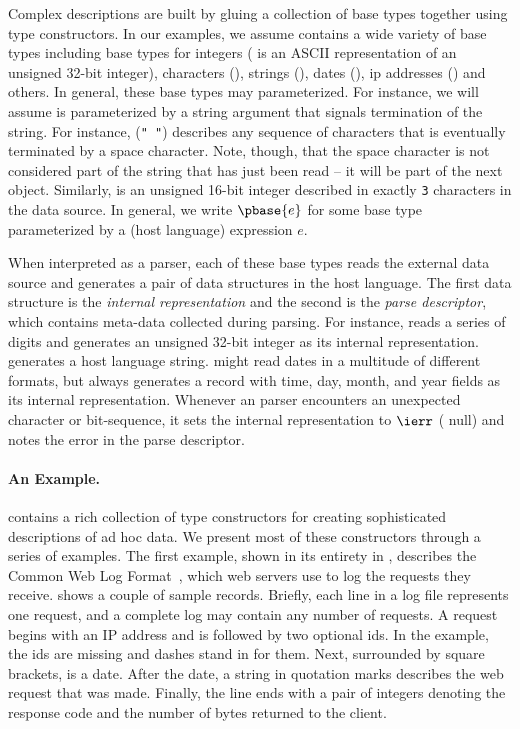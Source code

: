 Complex \ipads{} descriptions are built by gluing a collection of base
types together using \ipads{} type constructors.  In our examples, we
assume \ipads{} contains a wide variety of base types including base
types for integers (\Puint{} is an ASCII representation of an unsigned
32-bit integer), characters (\Pchar), strings (\Pstring), dates
(\Pdate), ip addresses (\Pip) and others.  In general, these base
types may parameterized.  For instance, we will assume \Pstring{} is
parameterized by a string argument that signals termination of the
string.  For instance, \Pstring({\tt " "}) describes any sequence of
characters that is eventually terminated by a space character. Note,
though, that the space character is not considered part of the string
that has just been read -- it will be part of the next object.
Similarly,  is an unsigned 16-bit
integer described in exactly {\tt 3} characters in the data source.
In general, we write $\pbase{e}$ for some base type parameterized by a
(host language) expression $e$.

When interpreted as a parser, each of these base types reads
the external data source and generates a pair of data structures
in the host language.  The first data structure is the
{\em internal representation}  and
the second is the {\em parse descriptor}, which contains meta-data collected during parsing.
For instance, \Puint{} reads a series of digits and generates an unsigned 32-bit integer as its
internal representation.  \Pstring{} generates a 
host language string.  
\Pdate{} might read dates in a multitude of
different formats, but always generates a record
with time, day, month, and year fields as its internal 
representation.  Whenever an \ipads{} parser encounters
an unexpected character or bit-sequence, it sets the internal representation to
$\ierr$ (\ie{} null) and notes the error in the
parse descriptor.

\paragraph*{An \ipads{} Example.}
\ipads{} contains a rich collection of type constructors for creating
sophisticated descriptions of ad hoc data.  We present most of these
constructors through a series of examples.  The first example, shown
in its entirety in , describes the Common Web
Log Format~\cite{wpp}, which web servers use to log the requests they
receive.   shows a couple of sample
records.  Briefly, each line in a log file represents one request, and
a complete log may contain any number of requests.  A request begins
with an IP address and is followed by two optional ids.  In the
example, the ids are missing and dashes stand in for them.  Next,
surrounded by square brackets, is a date.  After the date, a string in
quotation marks describes the web request that was made.  Finally, the
line ends with a pair of integers denoting the response code and the
number of bytes returned to the client.

